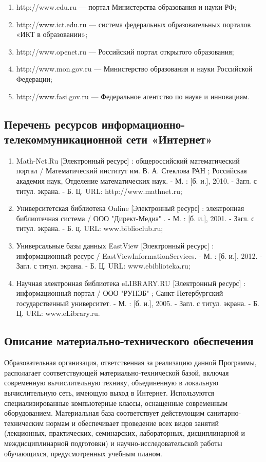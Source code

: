 \documentclass[a4paper, 12pt]{article}
\begin{document}
\begin{enumerate}
    \item http://www.edu.ru --- портал Министерства образования и науки РФ;
    \item http://www.ict.edu.ru --- система федеральных образовательных порталов «ИКТ в образовании»;
    \item http://www.openet.ru --- Российский портал открытого образования;
    \item http://www.mon.gov.ru  --- Министерство образования и науки Российской Федерации;
    \item http://www.fasi.gov.ru --- Федеральное агентство по науке и инновациям.
\end{enumerate}

\subsection{Перечень ресурсов информационно-телекоммуникационной сети «Интернет»}

\begin{enumerate}
    \item Math-Net.Ru [Электронный ресурс] : общероссийский математический портал / Математический институт им. В. А. Стеклова РАН ; Российская академия наук, Отделение математических наук. - М. : [б. и.], 2010. - Загл. с титул. экрана. - Б. Ц. URL: http://www.mathnet.ru;
    \item Университетская библиотека Online [Электронный ресурс] : электронная библиотечная система / ООО "Директ-Медиа" . - М. : [б. и.], 2001. - Загл. с титул. экрана. - Б. ц.  URL: www.biblioclub.ru;
    \item Универсальные базы данных EastView [Электронный ресурс] : информационный ресурс / EastViewInformationServices. - М. : [б. и.], 2012. - Загл. с титул. экрана. - Б. Ц. URL: www.ebiblioteka.ru;
    \item Научная электронная библиотека eLIBRARY.RU [Электронный ресурс] : информационный портал / ООО "РУНЭБ" ; Санкт-Петербургский государственный университет. - М. : [б. и.], 2005. - Загл. с титул. экрана. - Б. Ц. URL: www.eLibrary.ru.
\end{enumerate}

\subsection{Описание материально-технического обеспечения}

Образовательная организация, ответственная за реализацию данной Программы, располагает соответствующей материально-технической базой, включая современную вычислительную технику, объединенную в локальную вычислительную сеть, имеющую выход в Интернет. Используются специализированные компьютерные классы, оснащенные современным оборудованием. Материальная база соответствует действующим санитарно-техническим нормам и обеспечивает проведение всех видов занятий (лекционных, практических, семинарских, лабораторных, дисциплинарной и междисциплинарной подготовки) и научно-исследовательской работы обучающихся, предусмотренных учебным планом.
\end{document}
